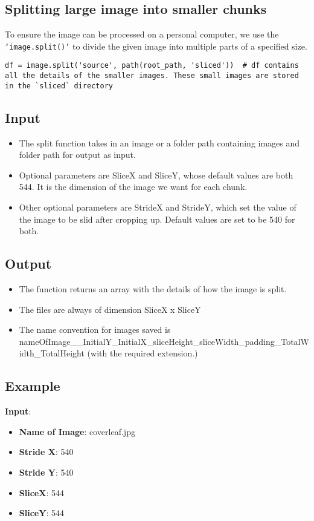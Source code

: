 \subsection{Splitting large image into smaller chunks}
To ensure the image can be processed on a personal computer, we use the \texttt{`image.split()'} to divide the given image into multiple parts of a specified size.

\begin{verbatim}
df = image.split('source', path(root_path, 'sliced'))  # df contains all the details of the smaller images. These small images are stored in the `sliced` directory
\end{verbatim}

\subsection{Input}
\begin{itemize}
  \setlength\itemsep{1mm}
  \item The split function takes in an image or a folder path containing images and folder path for output as input.
  \item Optional parameters are SliceX and SliceY, whose default values are both 544. It is the dimension of the image we want for each chunk.
  \item Other optional parameters are StrideX and StrideY, which set the value of the image to be slid after cropping up. Default values are set to be 540 for both.
\end{itemize}

\subsection{Output}
\begin{itemize}
  \setlength\itemsep{1mm}
  \item The function returns an array with the details of how the image is split.
  \item The files are always of dimension SliceX x SliceY
  \item The name convention for images saved is \newline
    nameOfImage\_\_InitialY\_InitialX\_sliceHeight\_sliceWidth\_padding\_TotalWidth\_TotalHeight \newline
    (with the required extension.)
\end{itemize}


\subsection{Example}
\textbf{Input}:
\begin{itemize}
  \setlength\itemsep{1mm}
  \item \textbf{Name of Image}: coverleaf.jpg
  \item \textbf{Stride X}: 540
  \item \textbf{Stride Y}: 540
  \item \textbf{SliceX}: 544
  \item \textbf{SliceY}: 544
\end{itemize}

